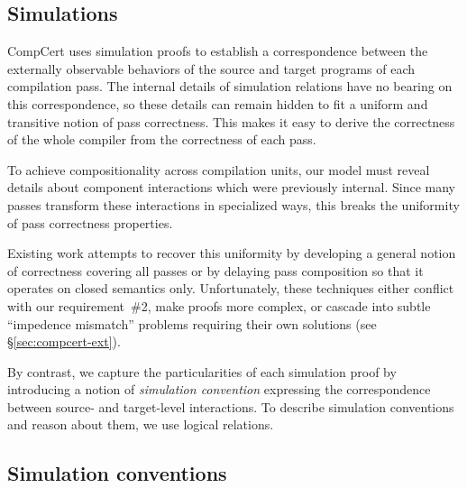 \documentclass[11pt,oneside,draft]{book}
\theoremstyle{definition}
\begin{document}


\subsection{Simulations} %

CompCert uses simulation proofs
to establish a correspondence between
the externally observable behaviors of
the source and target programs of each compilation pass.
The internal details of simulation relations
have no bearing on this correspondence,
so these details can remain hidden
to fit a uniform and transitive notion of pass correctness.
This makes it easy to derive the correctness
of the whole compiler
from the correctness of each pass.

To achieve compositionality across compilation units,
our model must reveal details
about component interactions
which were previously internal.
Since many passes transform
these interactions in
specialized ways,
this breaks the uniformity
of pass correctness properties.

Existing work attempts to recover this uniformity
by developing a general notion of correctness
covering all passes
or by delaying pass composition so that
it operates on closed semantics only.
Unfortunately, these techniques either
conflict with our requirement~\#2,
make proofs more complex,
or cascade into subtle ``impedence mismatch'' problems
requiring their own solutions
(see \S\ref{sec:compcert-ext}).

By contrast,
we capture the particularities of each simulation proof
by introducing a notion of \emph{simulation convention}
expressing the correspondence between
source- and target-level interactions.
To describe simulation conventions
and reason about them,
we use logical relations.


\subsection{Simulation conventions} \label{sec:simconv} %
\end{document}
